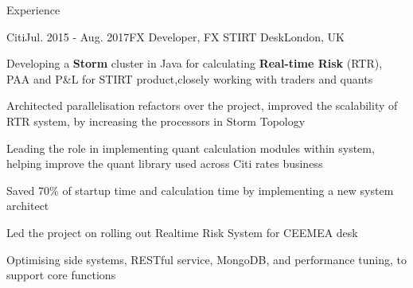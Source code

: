 \documentclass{resume} %
\begin{document}

    \begin{rSection}{Experience}

        \begin{rSubsection}{Citi}{Jul. 2015 - Aug. 2017}{FX Developer, FX STIRT Desk}{London, UK}
            \item Developing a \textbf{Storm} cluster in Java for calculating \textbf{Real-time Risk} (RTR), PAA and P\&L
            for STIRT product,closely working with traders and quants
            \item Architected parallelisation refactors over the project, improved the scalability of RTR system,
            by increasing the processors in Storm Topology
            \item Leading the role in implementing quant calculation modules within system,
            helping improve the quant library used across Citi rates business
            \item Saved 70\% of startup time and calculation time by implementing a new system architect
            \item Led the project on rolling out Realtime Risk System for CEEMEA desk
            \item Optimising side systems, RESTful service, MongoDB, and performance tuning, to support core functions
        \end{rSubsection}


\end{rSection}
\end{document}
